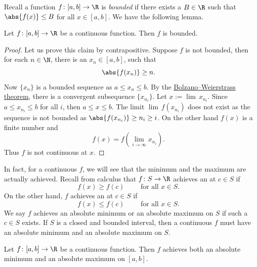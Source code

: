 \documentclass[12pt]{book}
\begin{document}
Recall a function $f \colon [a,b] \to \R$ is
\emph{bounded} if there exists a $B \in \R$ such that
$\abs{f(x)} \leq B$ for all $x \in [a,b]$.
We have the following lemma.

\begin{lemma}
Let $f \colon [a,b] \to \R$ be a continuous function.
Then $f$ is bounded.
\end{lemma}

\begin{proof}
Let us prove this claim by contrapositive.
Suppose $f$ is not bounded,
then for each
$n \in \N$, there is an $x_n \in [a,b]$, such that
\begin{equation*}
\abs{f(x_n)} \geq n .
\end{equation*}
Now $\{ x_n \}$ is a bounded sequence as $a \leq x_n \leq b$.
By the \hyperref[thm:bwseq]{Bolzano--Weierstrass theorem},
there is a convergent subsequence $\{ x_{n_i} \}$.
Let $x := \lim\, x_{n_i}$.
Since $a \leq x_{n_i} \leq b$ for all $i$, then $a \leq x \leq b$.
The limit $\lim\, f(x_{n_i})$ does
not exist as the sequence is not bounded as $\abs{f(x_{n_i})} \geq n_i \geq
i$.
On the other hand $f(x)$ is a finite number and
\begin{equation*}
f(x)
=
f\left( \lim_{i\to\infty} x_{n_i} \right) .
\end{equation*}
Thus $f$ is not continuous at $x$.
\end{proof}

In fact, for a continuous $f$, we will see that the minimum and
the maximum are actually achieved.
Recall from calculus that $f \colon S \to \R$ achieves an
\emph{} at $c \in S$ if
\begin{equation*}
f(x) \geq f(c) \qquad \text{ for all $x \in S$.}
\end{equation*}
On the other hand, $f$ achieves an 
\emph{} at $c \in S$ if
\begin{equation*}
f(x) \leq f(c) \qquad \text{ for all $x \in S$.}
\end{equation*}
We say $f$ achieves an absolute minimum or an absolute maximum on
$S$ if such a $c \in S$ exists.
If $S$ is a closed
and bounded interval, then a continuous $f$
must have an absolute minimum and an absolute
maximum on $S$.

\begin{thm}
Let $f \colon [a,b] \to \R$ be a continuous function.
Then $f$
achieves both an absolute minimum and an absolute maximum on $[a,b]$.
\end{thm}
\end{document}
